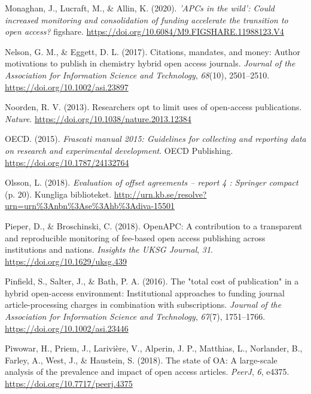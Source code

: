 \documentclass[a4paper,man,floatsintext,longtable,noextraspace,12pt]{apa6}
\newlength{\cslhangindent}
\newenvironment{cslreferences}%
  {\setlength{\parindent}{0pt}%
  \everypar{\setlength{\hangindent}{\cslhangindent}}\ignorespaces}%
  {\par}
\begin{document}
\begin{cslreferences}
\leavevmode\hypertarget{ref-Monaghan_2020}{}%
Monaghan, J., Lucraft, M., \& Allin, K. (2020). \emph{'APCs in the
wild': Could increased monitoring and consolidation of funding
accelerate the transition to open access?} figshare.
\url{https://doi.org/10.6084/M9.FIGSHARE.11988123.V4}

\leavevmode\hypertarget{ref-Nelson_2017}{}%
Nelson, G. M., \& Eggett, D. L. (2017). Citations, mandates, and money:
Author motivations to publish in chemistry hybrid open access journals.
\emph{Journal of the Association for Information Science and
Technology}, \emph{68}(10), 2501--2510.
\url{https://doi.org/10.1002/asi.23897}

\leavevmode\hypertarget{ref-Van_Noorden_2013}{}%
Noorden, R. V. (2013). Researchers opt to limit uses of open-access
publications. \emph{Nature}.
\url{https://doi.org/10.1038/nature.2013.12384}

\leavevmode\hypertarget{ref-Frascati}{}%
OECD. (2015). \emph{Frascati manual 2015: Guidelines for collecting and
reporting data on research and experimental development}. OECD
Publishing. \url{https://doi.org/10.1787/24132764}

\leavevmode\hypertarget{ref-Olsson1271866}{}%
Olsson, L. (2018). \emph{Evaluation of offset agreements -- report 4 :
Springer compact} (p. 20). Kungliga biblioteket.
\url{http://urn.kb.se/resolve?urn=urn\%3Anbn\%3Ase\%3Ahb\%3Adiva-15501}

\leavevmode\hypertarget{ref-Pieper_2018}{}%
Pieper, D., \& Broschinski, C. (2018). OpenAPC: A contribution to a
transparent and reproducible monitoring of fee-based open access
publishing across institutions and nations. \emph{Insights the UKSG
Journal}, \emph{31}. \url{https://doi.org/10.1629/uksg.439}

\leavevmode\hypertarget{ref-Pinfield_2016}{}%
Pinfield, S., Salter, J., \& Bath, P. A. (2016). The "total cost of
publication" in a hybrid open-access environment: Institutional
approaches to funding journal article-processing charges in combination
with subscriptions. \emph{Journal of the Association for Information
Science and Technology}, \emph{67}(7), 1751--1766.
\url{https://doi.org/10.1002/asi.23446}

\leavevmode\hypertarget{ref-Piwowar_2018}{}%
Piwowar, H., Priem, J., Larivière, V., Alperin, J. P., Matthias, L.,
Norlander, B., Farley, A., West, J., \& Haustein, S. (2018). The state
of OA: A large-scale analysis of the prevalence and impact of open
access articles. \emph{PeerJ}, \emph{6}, e4375.
\url{https://doi.org/10.7717/peerj.4375}


\end{cslreferences}
\end{document}

